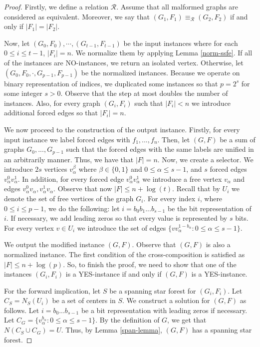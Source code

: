 \documentclass[en]{pracamgr}
\theoremstyle{definition}
\begin{document}
\begin{proof}
	Firstly, we define a relation $\mathcal{R}$. Assume that all malformed graphs are considered as equivalent. Moreover, we say that $(G_1,F_1) \equiv_\mathcal{R} (G_2,F_2)$ if and only if $|F_1|=|F_2|$.
	
	Now, let $(G_0,F_0),\cdots,(G_{t-1},F_{t-1})$ be the input instances where for each $0 \leq i \leq t-1$, $|F_i|=n$. We normalize them by applying Lemma \ref{norm-ssfe}. If all of the instances are NO-instances, we return an isolated vertex. Otherwise, let $(G_0,F_0,\cdot,G_{p-1},F_{p-1})$ be the normalized instances. Because we operate on binary representation of indices, we duplicated some instances so that $p=2^s$ for some integer $s>0$. Observe that the step at most doubles the number of instances. Also, for every graph $(G_i,F_i)$ such that $|F_i| < n$ we introduce additional forced edges so that $|F_i|=n$.
	
	We now proceed to the construction of the output instance. Firstly, for every input instance we label forced edges with $f_1,...,f_n$. Then, let $(G,F)$ be a sum of graphs $G_0,...,G_{p-1}$ such that the forced edges with the same labels are unified in an arbitrarily manner. Thus, we have that $|F|=n$. Now, we create a selector. We introduce $2s$ vertices $v_\alpha^\beta$ where $\beta \in \{0,1\}$ and $0 \leq \alpha \leq s-1$, and $s$ forced edges $v_\alpha^0v_\alpha^1$. In addition, for every forced edge $v_\alpha^0v_\alpha^1$ we introduce a free vertex $v_\alpha$ and edges $v_\alpha^0v_\alpha,v_\alpha^1v_\alpha$. Observe that now $|F|\leq n + \log(t)$. Recall that by $U_i$ we denote the set of free vertices of the graph $G_i$. For every index $i$, where $0 \leq i \leq p-1$, we do the following: let $i=b_0b_1...b_{s-1}$ be the bit representation of $i$. If necessary, we add leading zeros so that every value is represented by $s$ bits. For every vertex $v \in U_i$ we introduce the set of edges $\{vv^{1-b_\alpha}_\alpha: 0 \leq \alpha \leq s-1\}$.
	
	We output the modified instance $(G,F)$. Observe that $(G,F)$ is also a normalized instance. The first condition of the cross-composition is satisfied as $|F| \leq n + \log(p)$. So, to finish the proof, we need to show that one of the instances $(G_i,F_i)$ is a YES-instance if and only if $(G,F)$ is a YES-instance.
	
	For the forward implication, let $S$ be a spanning star forest for $(G_i,F_i)$. Let $C_S = N_S(U_i)$ be a set of centers in $S$. We construct a solution for $(G,F)$ as follows. Let $i=b_0...b_{s-1}$ be a bit representation with leading zeros if necessary. Let $C_G = \{v_{\alpha}^{b_\alpha}: 0 \leq \alpha \leq s-1\}$. By the definition of $G$, we get that $N(C_S \cup C_G) = U$. Thus, by Lemma \ref{span-lemma}, $(G,F)$ has a spanning star forest.
	

\end{proof}
\end{document}
